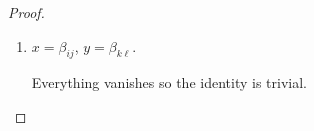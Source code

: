 \documentclass[a4paper,final, reqno]{amsart}
\theoremstyle{plain}
\theoremstyle{definition}
\begin{document}
\begin{proof}
\begin{enumerate}
			\[ \{\beta_{ij}, \delta_{str}^L(y)\} = \left\{\beta_{ij}, \sum w \right\} = \sum c_w w\]
			
			where $c_w$ is the number mod 2 of factors of $w$ which are of the  form $\alpha_{k\ell}$ satisfying $|\{i,j\} \cap \{k,\ell\}| = 1$. 
			
			Therefore it suffices to show that $c_y = c_w$ for all insertions $w$.
			
			Clearly this is true if $w$ is a $pq$ or $\beta$ insertion. If $w$ is an $\alpha$ insertion, then an $\alpha_{k\ell}$ contributing to $c_y$ can be split into $\alpha_{km}\alpha_{m\ell}$. But in this case, we must have either $|\{i,j\} \cap \{k,m\}| = 1$ or $|\{i,j\} \cap \{m,\ell\}| = 1$ (but not both). So either $\alpha_{km}$ or $\alpha_{m\ell}$ (but not both) will contribute to $c_w$. Thus $c_y=c_w$ in all cases.
			
			
			\item $x = \beta_{ij}$, $y = \beta_{k\ell}$.
			
			Everything vanishes so the identity is trivial.
			
			
			
			
			
			
			
		\end{enumerate}
		
	\end{proof}
	
\end{document}
